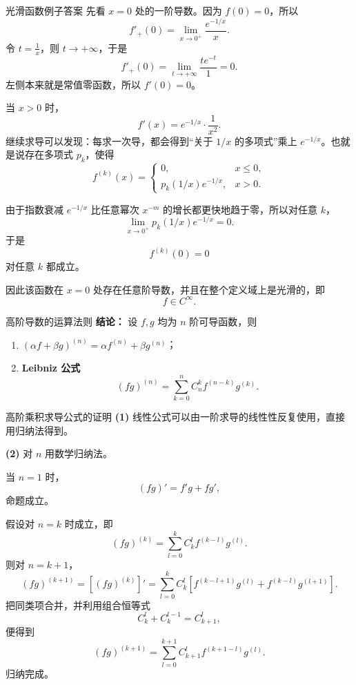 ﻿\documentclass[aspectratio=169,11pt]{ctexbeamer}
\begin{document}
\begin{frame}[allowframebreaks]{光滑函数例子答案}
\small
先看 $x=0$ 处的一阶导数。因为 $f(0)=0$，所以
\[
f'_+(0)=\lim_{x\to0^+}\frac{e^{-1/x}}{x}.
\]
令 $t=\frac1x$，则 $t\to+\infty$，于是
\[
f'_+(0)=\lim_{t\to+\infty}\frac{te^{-t}}{1}=0.
\]
左侧本来就是常值零函数，所以 $f'(0)=0$。

\vspace{0.4em}
当 $x>0$ 时，
\[
f'(x)=e^{-1/x}\cdot\frac1{x^2}.
\]
继续求导可以发现：每求一次导，都会得到“关于 $1/x$ 的多项式”乘上 $e^{-1/x}$。也就是说存在多项式 $p_k$，使得
\[
f^{(k)}(x)=
\begin{cases}
0,&x\le0,\\
p_k(1/x)e^{-1/x},&x>0.
\end{cases}
\]

由于指数衰减 $e^{-1/x}$ 比任意幂次 $x^{-m}$ 的增长都更快地趋于零，所以对任意 $k$，
\[
\lim_{x\to0^+}p_k(1/x)e^{-1/x}=0.
\]
于是
\[
f^{(k)}(0)=0
\]
对任意 $k$ 都成立。

因此该函数在 $x=0$ 处存在任意阶导数，并且在整个定义域上是光滑的，即
\[
f\in C^\infty.
\]
\end{frame}

\begin{frame}{高阶导数的运算法则}
\small
\textbf{结论：} 设 $f,g$ 均为 $n$ 阶可导函数，则
\begin{enumerate}
  \item $(\alpha f+\beta g)^{(n)}=\alpha f^{(n)}+\beta g^{(n)}$；
  \item \textbf{Leibniz 公式}
  \[
  (fg)^{(n)}=\sum_{k=0}^n C_n^k f^{(n-k)}g^{(k)}.
  \]
\end{enumerate}
\end{frame}

\begin{frame}[allowframebreaks]{高阶乘积求导公式的证明}
\small
\textbf{(1)} 线性公式可以由一阶求导的线性性反复使用，直接用归纳法得到。

\vspace{0.4em}
\textbf{(2)} 对 $n$ 用数学归纳法。

当 $n=1$ 时，
\[
(fg)'=f'g+fg',
\]
命题成立。

假设对 $n=k$ 时成立，即
\[
(fg)^{(k)}=\sum_{l=0}^k C_k^l f^{(k-l)}g^{(l)}.
\]
则对 $n=k+1$，
\[
(fg)^{(k+1)}=\left[(fg)^{(k)}\right]'
=\sum_{l=0}^k C_k^l\left[f^{(k-l+1)}g^{(l)}+f^{(k-l)}g^{(l+1)}\right].
\]
把同类项合并，并利用组合恒等式
\[
C_k^l+C_k^{l-1}=C_{k+1}^l,
\]
便得到
\[
(fg)^{(k+1)}=\sum_{l=0}^{k+1} C_{k+1}^l f^{(k+1-l)}g^{(l)}.
\]
归纳完成。
\end{frame}
\end{document}
